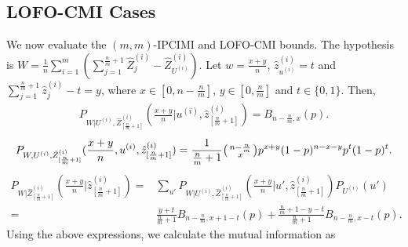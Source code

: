 \documentclass[onecolumn,romanappendices,10pt]{IEEEtran}
\begin{document}
	\subsection{LOFO-CMI Cases} \label{subapp:cal_LOFO}
	We now evaluate the $(m, m)$-IPCIMI and LOFO-CMI bounds. The hypothesis is $W = \frac{1}{n} \sum_{i=1}^{m} \left( \sum_{j=1}^{\frac{n}{m} + 1} \hat{Z}^{(i)}_j - \hat{Z}^{(i)}_{U^{(i)}} \right)$. Let $w = \frac{x + y}{n}$, $\hat{z}^{(i)}_{u^{(i)}} = t$ and $\sum_{j=1}^{\frac{n}{m} + 1} \hat{z}^{(i)}_j - t = y$, where $x \in [0, n - \frac{n}{m}]$, $y \in [0, \frac{n}{m}]$ and $t \in \{0, 1\}$. Then,
	\begin{equation}
		\begin{aligned}
			P_{W | U^{(i)}, \hat{Z}_{[\frac{n}{m}+1]}^{(i)}}(\frac{x + y}{n} | u^{(i)}, \hat{z}_{[\frac{n}{m}+1]}^{(i)}) = B_{n - \frac{n}{m}, x}(p).
		\end{aligned}
	\end{equation}
	\begin{equation}
		\begin{aligned}
			P_{W, U^{(i)}, \hat{Z}_{[\frac{n}{m}+1]}^{(i)}}(\frac{x + y}{n}, u^{(i)}, \hat{z}_{[\frac{n}{m}+1]}^{(i)}) = \frac{1}{\frac{n}{m} + 1} \begin{psmallmatrix} n - \frac{n}{m} \\ x \end{psmallmatrix} p^{x+y} (1 - p)^{n - x - y} p^t (1 - p)^t.
		\end{aligned}
	\end{equation}
	\begin{equation}
		\begin{aligned}
			P_{W | \hat{Z}_{[\frac{n}{m}+1]}^{(i)}}(\frac{x + y}{n} | \hat{z}_{[\frac{n}{m}+1]}^{(i)}) =& \sum_{u'} P_{W | U^{(i)}, \hat{Z}_{[\frac{n}{m}+1]}^{(i)}}(\frac{x + y}{n} | u', \hat{z}_{[\frac{n}{m}+1]}^{(i)}) P_{U^{(i)}}(u') \\
			=& \frac{y + t}{\frac{n}{m} + 1} B_{n - \frac{n}{m}, x + 1 - t}(p) + \frac{\frac{n}{m} + 1 - y - t}{\frac{n}{m} + 1} B_{n - \frac{n}{m}, x - t}(p).
		\end{aligned}
	\end{equation}
	Using the above expressions, we calculate the mutual information as
\end{document}

